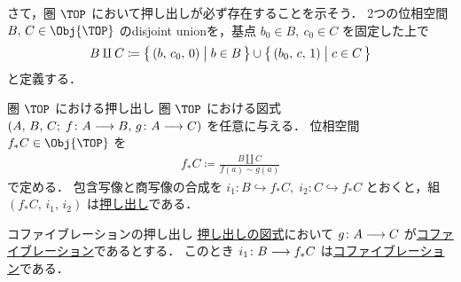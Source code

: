 \documentclass[algtopo_main]{subfiles}
\begin{document}
さて，圏 $\TOP$ において押し出しが必ず存在することを示そう．
2つの位相空間 $B,\, C \in \Obj{\TOP}$ のdisjoint unionを，基点 $b_0 \in B,\ c_0 \in C$ を固定した上で
\begin{align}
    B \amalg C \coloneqq \bigl\{\, (b,\, c_0,\, 0) \bigm| b\in B \,\bigr\} \cup \bigl\{\, (b_0,\, c,\, 1) \bigm| c \in C \,\bigr\} 
\end{align}
と定義する．

\begin{myprop}[label=prop:TOP-pushout]{圏 $\TOP$ における押し出し}
    圏 $\TOP$ における図式 $(A,\, B,\, C;\; f \colon A \longrightarrow B,\, g \colon A \longrightarrow C)$ を任意に与える． 
    位相空間 $f_* C \in \Obj{\TOP}$ を
    \begin{align}
        f_*C \coloneqq \frac{B \amalg C}{f(a) \sim g(a)}
    \end{align}
    で定める． %
    包含写像と商写像の合成を $i_1 \colon B \hookrightarrow f_*C,\; i_2 \colon C \hookrightarrow f_*C$ とおくと，組 $(f_*C,\, i_1,\, i_2)$ は\hyperref[def:pushout]{押し出し}である．
\end{myprop}

\begin{mytheo}[label=def:cofib-pushout]{コファイブレーションの押し出し}
    \hyperref[cmtd:pushout]{押し出しの図式}において $g \colon A \longrightarrow C$ が\hyperref[def:cofibration]{コファイブレーション}であるとする．
    このとき $i_1 \colon B \longrightarrow f_*C$ は\hyperref[def:cofibration]{コファイブレーション}である．
\end{mytheo}
\end{document}

